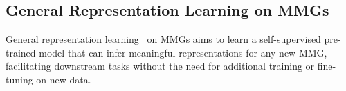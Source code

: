 

\subsection{General Representation Learning on MMGs}
General representation learning~\cite{muennighoff2022mteb,radford2021learning,girdhar2023imagebind,wang2023one} on MMGs aims to learn a self-supervised pre-trained model 
that can infer meaningful representations for any new MMG, facilitating downstream tasks without the need for additional training or fine-tuning on new data.


